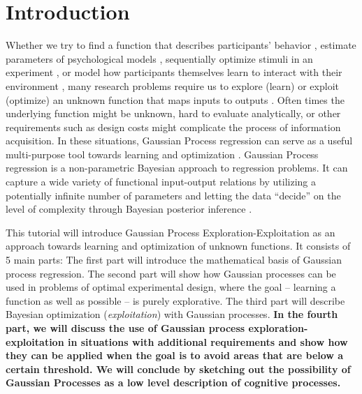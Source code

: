 \documentclass[authoryear,11pt,review]{elsarticle}
\newcommand{\fixme}[1]{\textbf{#1}}
\begin{document}
\section{Introduction}
Whether we try to find a function that describes participants' behavior \citep{cavagnaro2014functional}, estimate parameters of psychological models \citep{wetzels2010bayesian}, sequentially optimize stimuli in an experiment \citep{myung2009optimal}, or model how participants themselves learn to interact with their environment \citep{meder2012information}, many research problems require us to explore (learn) or exploit (optimize) an unknown function that maps inputs to outputs \citep{mockus2010bayesian}. Often times the underlying function might be unknown, hard to evaluate analytically, or other requirements such as design costs might complicate the process of information acquisition. In these situations, Gaussian Process regression can serve as a useful multi-purpose tool towards learning and optimization \citep{rasmussen2006gaussian}. Gaussian Process regression is a non-parametric Bayesian approach \citep{gershman2012tutorial} to regression problems. It can capture a wide variety of functional input-output relations by utilizing a potentially infinite number of parameters and letting the data ``decide'' on the level of complexity through Bayesian posterior inference \citep{williams1998prediction}.

This tutorial will introduce Gaussian Process Exploration-Exploitation as an approach towards learning and optimization of unknown functions. %
It consists of 5 main parts: The first part will introduce the mathematical basis of Gaussian process regression. The second part will show how Gaussian processes can be used in problems of optimal experimental design, where the goal -- learning a function as well as possible -- is purely explorative. The third part will describe Bayesian optimization (\emph{exploitation}) with Gaussian processes. \fixme{In the fourth part, we will discuss the use of Gaussian process exploration-exploitation in situations with additional requirements and show how they can be applied when the goal is to avoid areas that are below a certain threshold. We will conclude by sketching out the possibility of Gaussian Processes as a low level description of cognitive processes.}


\end{document}
